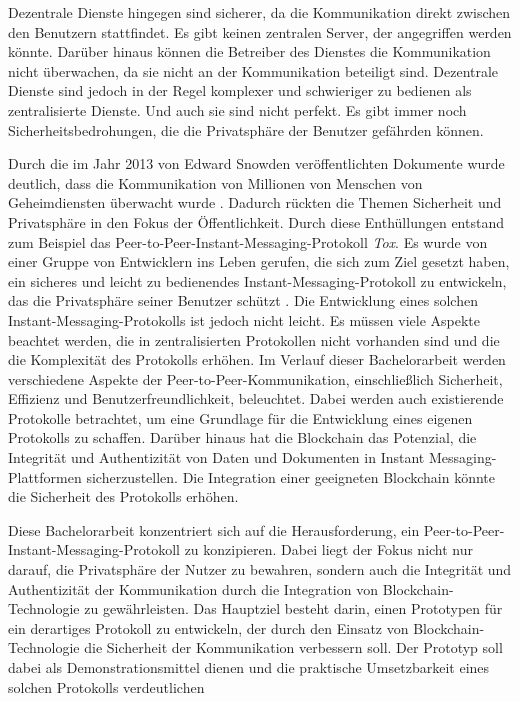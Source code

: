 Dezentrale Dienste hingegen sind sicherer, da die Kommunikation direkt zwischen den Benutzern stattfindet. Es gibt keinen zentralen Server, der angegriffen werden könnte. Darüber hinaus können die Betreiber des Dienstes die Kommunikation nicht überwachen, da sie nicht an der Kommunikation beteiligt sind. Dezentrale Dienste sind jedoch in der Regel komplexer und schwieriger zu bedienen als zentralisierte Dienste. Und auch sie sind nicht perfekt. Es gibt immer noch Sicherheitsbedrohungen, die die Privatsphäre der Benutzer gefährden können.


Durch die im Jahr 2013 von Edward Snowden veröffentlichten Dokumente wurde deutlich, dass die Kommunikation von Millionen von Menschen von Geheimdiensten überwacht wurde \parencite{greenwald_NSA}. Dadurch rückten die Themen Sicherheit und Privatsphäre in den Fokus der Öffentlichkeit. Durch diese Enthüllungen entstand zum Beispiel das Peer-to-Peer-Instant-Messaging-Protokoll \textit{Tox}. Es wurde von einer Gruppe von Entwicklern ins Leben gerufen, die sich zum Ziel gesetzt haben, ein sicheres und leicht zu bedienendes Instant-Messaging-Protokoll zu entwickeln, das die Privatsphäre seiner Benutzer schützt \parencite{tox_about}. Die Entwicklung eines solchen Instant-Messaging-Protokolls ist jedoch nicht leicht. Es müssen viele Aspekte beachtet werden, die in zentralisierten Protokollen nicht vorhanden sind und die die Komplexität des Protokolls erhöhen. Im Verlauf dieser Bachelorarbeit werden verschiedene Aspekte der Peer-to-Peer-Kommunikation, einschließlich Sicherheit, Effizienz und Benutzerfreundlichkeit, beleuchtet. Dabei werden auch existierende Protokolle betrachtet, um eine Grundlage für die Entwicklung eines eigenen Protokolls zu schaffen. Darüber hinaus hat die Blockchain das Potenzial, die Integrität und Authentizität von Daten und Dokumenten in Instant Messaging-Plattformen sicherzustellen. Die Integration einer geeigneten Blockchain könnte die Sicherheit des Protokolls erhöhen.

Diese Bachelorarbeit konzentriert sich auf die Herausforderung, ein Peer-to-Peer-Instant-Messaging-Protokoll zu konzipieren. Dabei liegt der Fokus nicht nur darauf, die Privatsphäre der Nutzer zu bewahren, sondern auch die Integrität und Authentizität der Kommunikation durch die Integration von Blockchain-Technologie zu gewährleisten. Das Hauptziel besteht darin, einen Prototypen für ein derartiges Protokoll zu entwickeln, der durch den Einsatz von Blockchain-Technologie die Sicherheit der Kommunikation verbessern soll. Der Prototyp soll dabei als Demonstrationsmittel dienen und die praktische Umsetzbarkeit eines solchen Protokolls verdeutlichen
